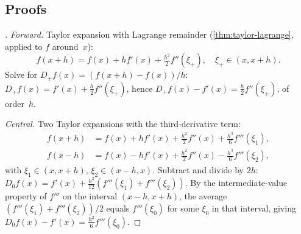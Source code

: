 \subsection*{Proofs}

\begin{proof}[]
\emph{Forward.} Taylor expansion with Lagrange remainder
(\cref{thm:taylor-lagrange}, applied to $f$ around~$x$):
\[
  f(x + h) = f(x) + h f'(x) + \tfrac{h^2}{2} f''(\xi_+),
  \quad \xi_+ \in (x, x + h).
\]
Solve for $D_+ f(x) = (f(x + h) - f(x))/h$:
$D_+ f(x) = f'(x) + \tfrac{h}{2} f''(\xi_+)$, hence
$D_+ f(x) - f'(x) = \tfrac{h}{2} f''(\xi_+)$, of order~$h$.

\emph{Central.} Two Taylor expansions with the third-derivative term:
\begin{align*}
  f(x + h) &= f(x) + h f'(x) + \tfrac{h^2}{2} f''(x) + \tfrac{h^3}{6} f'''(\xi_1), \\
  f(x - h) &= f(x) - h f'(x) + \tfrac{h^2}{2} f''(x) - \tfrac{h^3}{6} f'''(\xi_2),
\end{align*}
with $\xi_1 \in (x, x + h)$, $\xi_2 \in (x - h, x)$. Subtract and
divide by $2h$:
$D_0 f(x) = f'(x) + \tfrac{h^2}{12}(f'''(\xi_1) + f'''(\xi_2))$.
By the intermediate-value property of $f'''$ on the interval
$(x - h, x + h)$, the average $(f'''(\xi_1) + f'''(\xi_2))/2$ equals
$f'''(\xi_0)$ for some $\xi_0$ in that interval, giving
$D_0 f(x) - f'(x) = \tfrac{h^2}{6} f'''(\xi_0)$.
\end{proof}

